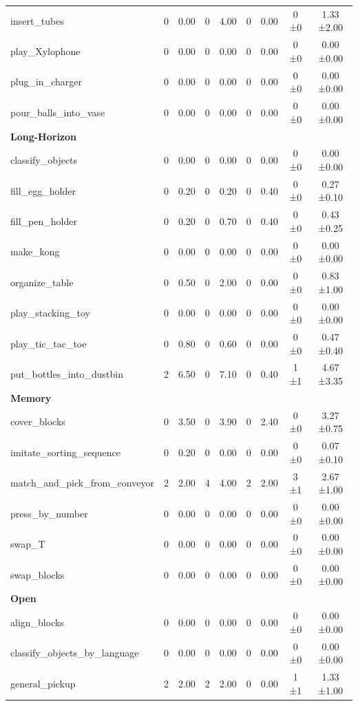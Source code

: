\begin{table}[H]
{\begin{tabular}{l|c|c|c|c|c|c|c|c}
insert\_tubes & 0 & 0.00 & 0 & 4.00 & 0 & 0.00 & 0 ±0 & 1.33 ±2.00 \\
play\_Xylophone & 0 & 0.00 & 0 & 0.00 & 0 & 0.00 & 0 ±0 & 0.00 ±0.00 \\
plug\_in\_charger & 0 & 0.00 & 0 & 0.00 & 0 & 0.00 & 0 ±0 & 0.00 ±0.00 \\
pour\_balls\_into\_vase & 0 & 0.00 & 0 & 0.00 & 0 & 0.00 & 0 ±0 & 0.00 ±0.00 \\
\hline
\multicolumn{9}{l}{\textbf{Long-Horizon}} \\
classify\_objects & 0 & 0.00 & 0 & 0.00 & 0 & 0.00 & 0 ±0 & 0.00 ±0.00 \\
fill\_egg\_holder & 0 & 0.20 & 0 & 0.20 & 0 & 0.40 & 0 ±0 & 0.27 ±0.10 \\
fill\_pen\_holder & 0 & 0.20 & 0 & 0.70 & 0 & 0.40 & 0 ±0 & 0.43 ±0.25 \\
make\_kong & 0 & 0.00 & 0 & 0.00 & 0 & 0.00 & 0 ±0 & 0.00 ±0.00 \\
organize\_table & 0 & 0.50 & 0 & 2.00 & 0 & 0.00 & 0 ±0 & 0.83 ±1.00 \\
play\_stacking\_toy & 0 & 0.00 & 0 & 0.00 & 0 & 0.00 & 0 ±0 & 0.00 ±0.00 \\
play\_tic\_tac\_toe & 0 & 0.80 & 0 & 0.60 & 0 & 0.00 & 0 ±0 & 0.47 ±0.40 \\
put\_bottles\_into\_dustbin & 2 & 6.50 & 0 & 7.10 & 0 & 0.40 & 1 ±1 & 4.67 ±3.35 \\
\hline
\multicolumn{9}{l}{\textbf{Memory}} \\
cover\_blocks & 0 & 3.50 & 0 & 3.90 & 0 & 2.40 & 0 ±0 & 3.27 ±0.75 \\
imitate\_sorting\_sequence & 0 & 0.20 & 0 & 0.00 & 0 & 0.00 & 0 ±0 & 0.07 ±0.10 \\
match\_and\_pick\_from\_conveyor & 2 & 2.00 & 4 & 4.00 & 2 & 2.00 & 3 ±1 & 2.67 ±1.00 \\
press\_by\_number & 0 & 0.00 & 0 & 0.00 & 0 & 0.00 & 0 ±0 & 0.00 ±0.00 \\
swap\_T & 0 & 0.00 & 0 & 0.00 & 0 & 0.00 & 0 ±0 & 0.00 ±0.00 \\
swap\_blocks & 0 & 0.00 & 0 & 0.00 & 0 & 0.00 & 0 ±0 & 0.00 ±0.00 \\
\hline
\multicolumn{9}{l}{\textbf{Open}} \\
align\_blocks & 0 & 0.00 & 0 & 0.00 & 0 & 0.00 & 0 ±0 & 0.00 ±0.00 \\
classify\_objects\_by\_language & 0 & 0.00 & 0 & 0.00 & 0 & 0.00 & 0 ±0 & 0.00 ±0.00 \\
general\_pickup & 2 & 2.00 & 2 & 2.00 & 0 & 0.00 & 1 ±1 & 1.33 ±1.00 \\

\end{tabular}}
\end{table}
